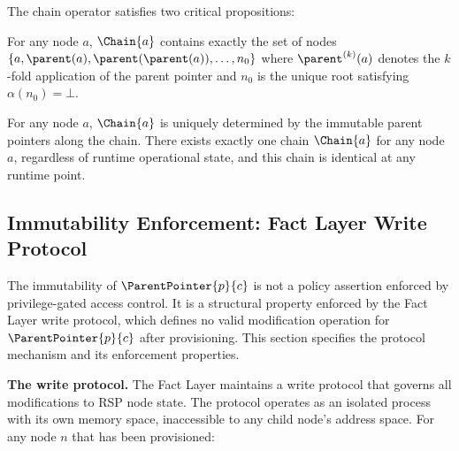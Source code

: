 The chain operator satisfies two critical propositions:

\begin{prop}
\label{prop:chain-membership}
For any node $a$, $\Chain{a}$ contains exactly the set of nodes $\{a, \parent(a), \parent(\parent(a)), \ldots, n_0\}$ where $\parent^{(k)}(a)$ denotes the $k$-fold application of the parent pointer and $n_0$ is the unique root satisfying $\alpha(n_0) = \bot$.
\end{prop}

\begin{prop}
\label{prop:chain-uniqueness}
For any node $a$, $\Chain{a}$ is uniquely determined by the immutable parent pointers along the chain. There exists exactly one chain $\Chain{a}$ for any node $a$, regardless of runtime operational state, and this chain is identical at any runtime point.
\end{prop}

\subsection{Immutability Enforcement: Fact Layer Write Protocol}
\label{sec:fact-layer-write-protocol}

The immutability of $\ParentPointer{p}{c}$ is not a policy assertion enforced by privilege-gated access control. It is a structural property enforced by the Fact Layer write protocol, which defines no valid modification operation for $\ParentPointer{p}{c}$ after provisioning. This section specifies the protocol mechanism and its enforcement properties.

\medskip
\noindent\textbf{The write protocol.} The Fact Layer maintains a write protocol that governs all modifications to RSP node state. The protocol operates as an isolated process with its own memory space, inaccessible to any child node's address space. For any node $n$ that has been provisioned:

